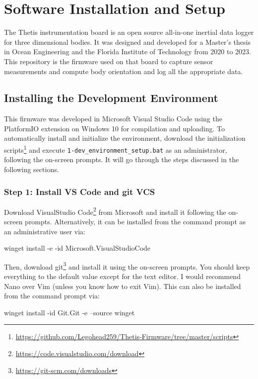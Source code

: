 \chapter{Software Installation and Setup} 

The Thetis instrumentation board is an open source all-in-one inertial data logger for three dimensional bodies.
It was designed and developed for a Master's thesis in Ocean Engineering and the Florida Institute of Technology from 2020 to 2023.
This repository is the firmware used on that board to capture sensor measurements and compute body orientation and log all the appropriate data.

\section{Installing the Development Environment}
This firmware was developed in Microsoft Visual Studio Code using the PlatformIO extension on Windows 10 for compilation and uploading.
To automatically install and initialize the environment, download the initialization scripts\footnote{\url{https://github.com/Legohead259/Thetis-Firmware/tree/master/scripts}} and execute \lstinline[style=customInline]|1-dev_environment_setup.bat| as an administrator, following the on-screen prompts.
It will go through the steps discussed in the following sections.

\subsection{Step 1: Install VS Code and git VCS}
Download VisualStudio Code\footnote{\url{https://code.visualstudio.com/download}} from Microsoft and install it following the on-screen prompts.
Alternatively, it can be installed from the command prompt as an administrative user via:

\begin{bash}
    winget install -e -id Microsoft.VisualStudioCode
\end{bash}

Then, download git\footnote{\url{https://git-scm.com/downloads}} and install it using the on-screen prompts.
You should keep everything to the default value except for the text editor.
I would recommend Nano over Vim (unless you know how to exit Vim).
This can also be installed from the command prompt via:

\begin{bash}
    winget install -id Git.Git -e --source winget
\end{bash}


